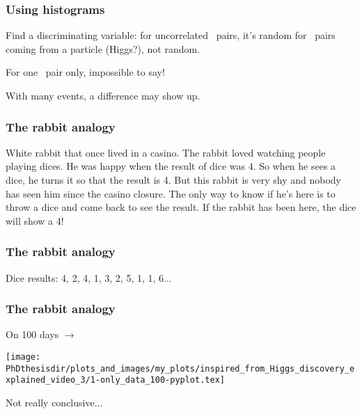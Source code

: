 \begin{frame}
\frametitle{Using histograms}

\manip Find a discriminating variable:
\submanip for uncorrelated \tau\ pairs, it's random
\submanip for \tau\ pairs coming from a particle (Higgs?), not random.

\manip For one \tau\ pair only, impossible to say!

\manip With many events, a difference may show up.
\end{frame}

\begin{frame}
\frametitle{The rabbit analogy}

\manip White rabbit that once lived in a casino.
\submanip The rabbit loved watching people playing dices.
\submanip He was happy when the result of dice was 4.
\submanip So when he sees a dice, he turns it so that the result is 4.
\submanip But this rabbit is very shy and nobody has seen him since the casino closure.
\submanip The only way to know if he's here is to throw a dice and come back to see the result.
\submanip If the rabbit has been here, the dice will show a 4!
\end{frame}

\begin{frame}
\frametitle{The rabbit analogy}

\manip Dice results:
4\pause,
2\pause,
4,
1,
3,
2,
5,
1,
1,
6...
\end{frame}

\begin{frame}
\frametitle{The rabbit analogy}
\begin{center}
\begin{minipage}[c]{.29\textwidth}
On \num{100} days $\rightarrow$
\end{minipage}
\begin{minipage}[c]{.4\textwidth}
\vspace{-\baselineskip}
\texttt{[image: \\PhDthesisdir/plots\_and\_images/my\_plots/inspired\_from\_Higgs\_discovery\_explained\_video\_3/1-only\_data\_100-pyplot.tex]}
\end{minipage}
\begin{minipage}[c]{.29\textwidth}
Not really conclusive...
\end{minipage}
\end{center}
\end{frame}

